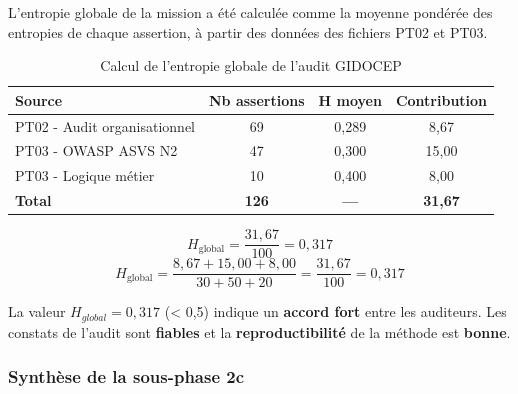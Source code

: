 \documentclass[12pt,a4paper,oneside]{report}
\begin{document}
L'entropie globale de la mission a été calculée comme la moyenne 
pondérée des entropies de chaque assertion, à partir des données 
des fichiers PT02 et PT03.

\begin{table}[H]
	\centering\small
	\caption{Calcul de l'entropie globale de l'audit GIDOCEP}
	\label{tab:hglobal_gidocep}
	\begin{tabularx}{\textwidth}{|>{\raggedright\arraybackslash}X|c|c|c|}
		\hline
		\rowcolor{theadcolor}
		\color{white}\textbf{Source} &
		\color{white}\textbf{Nb assertions} &
		\color{white}\textbf{H moyen} &
		\color{white}\textbf{Contribution} \\
		\hline
		PT02 - Audit organisationnel & 69 & 0,289 & 8,67 \\
		\hline
		PT03 - OWASP ASVS N2 & 47 & 0,300 & 15,00 \\
		\hline
		PT03 - Logique métier & 10 & 0,400 & 8,00 \\
		\hline
		\rowcolor{theadcolor}
		\color{white}\textbf{Total} &
		\color{white}\textbf{126} &
		\color{white}\textbf{---} &
		\color{white}\textbf{31,67} \\
		\hline
	\end{tabularx}
\end{table}

\vspace{0.1cm}
\[
H_{\text{global}} = \frac{31,67}{100} = 0,317
\]
\[
H_{\text{global}} = \frac{8{,}67 + 15{,}00 + 8{,}00}{30 + 50 + 20} = \frac{31{,}67}{100} = 0{,}317
\]

La valeur $H_{global} = 0{,}317$ (< 0,5) indique un \textbf{accord fort} 
entre les auditeurs. Les constats de l'audit sont \textbf{fiables} 
et la \textbf{reproductibilité} de la méthode est \textbf{bonne}.

\subsubsection{Synthèse de la sous-phase 2c}
\end{document}
